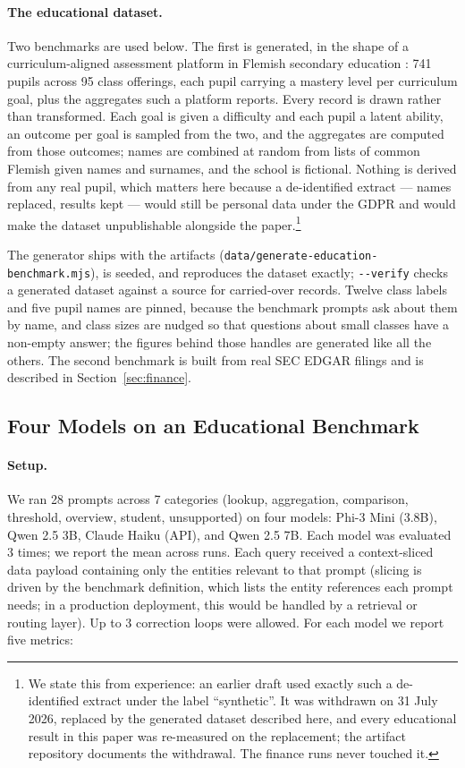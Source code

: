 \documentclass[11pt,a4paper]{article}
\begin{document}
\paragraph{The educational dataset.} Two benchmarks are used below. The first is generated, in the shape of a curriculum-aligned assessment platform in Flemish secondary education \citep{naviskore}: 741 pupils across 95 class offerings, each pupil carrying a mastery level per curriculum goal, plus the aggregates such a platform reports. Every record is drawn rather than transformed. Each goal is given a difficulty and each pupil a latent ability, an outcome per goal is sampled from the two, and the aggregates are computed from those outcomes; names are combined at random from lists of common Flemish given names and surnames, and the school is fictional. Nothing is derived from any real pupil, which matters here because a de-identified extract --- names replaced, results kept --- would still be personal data under the GDPR and would make the dataset unpublishable alongside the paper.\footnote{We state this from experience: an earlier draft used exactly such a de-identified extract under the label ``synthetic''. It was withdrawn on 31 July 2026, replaced by the generated dataset described here, and every educational result in this paper was re-measured on the replacement; the artifact repository documents the withdrawal. The finance runs never touched it.}

The generator ships with the artifacts (\texttt{data/generate-education-benchmark.mjs}), is seeded, and reproduces the dataset exactly; \texttt{-{}-verify} checks a generated dataset against a source for carried-over records. Twelve class labels and five pupil names are pinned, because the benchmark prompts ask about them by name, and class sizes are nudged so that questions about small classes have a non-empty answer; the figures behind those handles are generated like all the others. The second benchmark is built from real SEC EDGAR filings and is described in Section~\ref{sec:finance}.

\subsection{Four Models on an Educational Benchmark}
\label{sec:education}

\paragraph{Setup.} We ran 28 prompts across 7 categories (lookup, aggregation, comparison, threshold, overview, student, unsupported) on four models: Phi-3 Mini (3.8B), Qwen 2.5 3B, Claude Haiku (API), and Qwen 2.5 7B. Each model was evaluated 3 times; we report the mean across runs. Each query received a context-sliced data payload containing only the entities relevant to that prompt (slicing is driven by the benchmark definition, which lists the entity references each prompt needs; in a production deployment, this would be handled by a retrieval or routing layer). Up to 3 correction loops were allowed. For each model we report five metrics:
\end{document}
